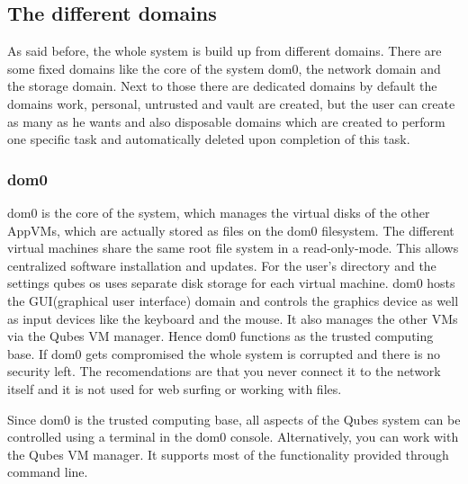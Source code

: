 \documentclass[runningheads,a4paper]{article}
\begin{document}
\subsection{The different domains}
As said before, the whole system is build up from different
domains. There are some fixed domains like the core of the system
dom0, the network domain and the storage domain. Next to those there
are dedicated domains by default the domains work, personal,
untrusted and vault are created, but the user can create as many as he wants and
also disposable domains which are created to perform one specific task
and automatically deleted upon completion of this task.

\subsubsection{dom0}

dom0 is the core of the system, which manages the virtual disks of the
other AppVMs, which are actually stored as files on the dom0
filesystem. The different virtual machines share the same root file
system in a read-only-mode. This allows centralized software
installation and updates. For the user's directory and the settings
qubes os uses separate disk storage for each virtual machine. 
dom0 hosts the GUI(graphical user interface) domain and controls the
graphics device as well as input devices like the keyboard and the
mouse. It also manages the other VMs via the Qubes VM manager. Hence
dom0 functions as the trusted computing base. If dom0 gets compromised
the whole system is corrupted and there is no security left. The
recomendations are that you never connect it to the network itself and
it is not used for web surfing or working with files.

Since dom0 is the trusted computing base, all aspects of the Qubes
system can be controlled using a terminal in the dom0 console. 
Alternatively, you can work with the Qubes VM
manager. It supports most of the functionality provided through
command line. 
\end{document}
